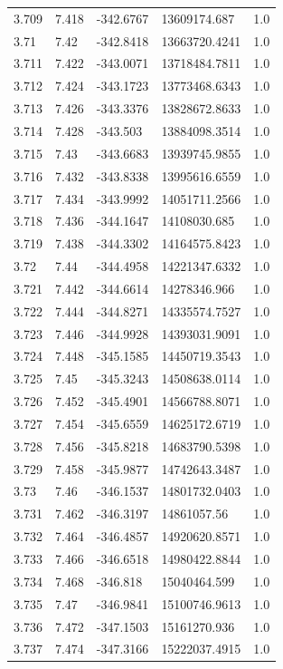 \begin{tabular}{lllll}
3.709 & 7.418 & -342.6767 & 13609174.687 & 1.0 \\
3.71 & 7.42 & -342.8418 & 13663720.4241 & 1.0 \\
3.711 & 7.422 & -343.0071 & 13718484.7811 & 1.0 \\
3.712 & 7.424 & -343.1723 & 13773468.6343 & 1.0 \\
3.713 & 7.426 & -343.3376 & 13828672.8633 & 1.0 \\
3.714 & 7.428 & -343.503 & 13884098.3514 & 1.0 \\
3.715 & 7.43 & -343.6683 & 13939745.9855 & 1.0 \\
3.716 & 7.432 & -343.8338 & 13995616.6559 & 1.0 \\
3.717 & 7.434 & -343.9992 & 14051711.2566 & 1.0 \\
3.718 & 7.436 & -344.1647 & 14108030.685 & 1.0 \\
3.719 & 7.438 & -344.3302 & 14164575.8423 & 1.0 \\
3.72 & 7.44 & -344.4958 & 14221347.6332 & 1.0 \\
3.721 & 7.442 & -344.6614 & 14278346.966 & 1.0 \\
3.722 & 7.444 & -344.8271 & 14335574.7527 & 1.0 \\
3.723 & 7.446 & -344.9928 & 14393031.9091 & 1.0 \\
3.724 & 7.448 & -345.1585 & 14450719.3543 & 1.0 \\
3.725 & 7.45 & -345.3243 & 14508638.0114 & 1.0 \\
3.726 & 7.452 & -345.4901 & 14566788.8071 & 1.0 \\
3.727 & 7.454 & -345.6559 & 14625172.6719 & 1.0 \\
3.728 & 7.456 & -345.8218 & 14683790.5398 & 1.0 \\
3.729 & 7.458 & -345.9877 & 14742643.3487 & 1.0 \\
3.73 & 7.46 & -346.1537 & 14801732.0403 & 1.0 \\
3.731 & 7.462 & -346.3197 & 14861057.56 & 1.0 \\
3.732 & 7.464 & -346.4857 & 14920620.8571 & 1.0 \\
3.733 & 7.466 & -346.6518 & 14980422.8844 & 1.0 \\
3.734 & 7.468 & -346.818 & 15040464.599 & 1.0 \\
3.735 & 7.47 & -346.9841 & 15100746.9613 & 1.0 \\
3.736 & 7.472 & -347.1503 & 15161270.936 & 1.0 \\
3.737 & 7.474 & -347.3166 & 15222037.4915 & 1.0 \\

\end{tabular}
